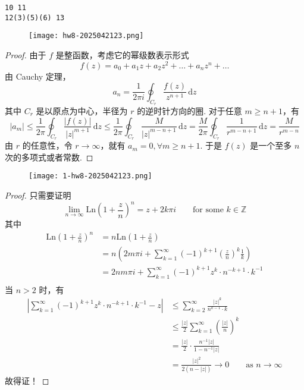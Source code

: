 \begin{lstlisting}
10 11 
12(3)(5)(6) 13
\end{lstlisting}
\begin{exercise}
\begin{figure}[H]
\centering
\texttt{[image: hw8-2025042123.png]}
\label{}
\end{figure}
\end{exercise}
\begin{proof}
由于 $f$ 是整函数，考虑它的幂级数表示形式
\[
f(z)=a_0+a_1z+a_2z^2+\dots+a_nz^{n}+\dots
\]
由 Cauchy 定理，
\[
a_n=\frac{1}{2\pi i}\oint_{C_{r}} \frac{f(z)}{z^{n+1}} \, \mathrm{d}z
\]
其中 $C_{r}$ 是以原点为中心，半径为 $r$ 的逆时针方向的圈. 对于任意 $m\geq n+1$，有
\[
\lvert a_m \rvert \leq \frac{1}{2\pi}\oint_{C_{r}} \frac{\lvert f(z) \rvert }{\lvert z \rvert ^{m+1}} \, \mathrm{d}z  \leq \frac{1}{2\pi}\oint_{C_{r}} \frac{M}{\lvert z \rvert ^{m-n+1}} \, \mathrm{d}z =\frac{M}{2\pi}\oint_{C_{r}} \frac{1}{r^{m-n+1}} \, \mathrm{d}z =\frac{M}{r^{m-n}}
\]
由 $r$ 的任意性，令 $r\to \infty$，就有 $a_m=0,\forall m\geq n+1$. 于是 $f(z)$ 是一个至多 $n$ 次的多项式或者常数.
\end{proof}

\begin{exercise}
\begin{figure}[H]
\centering
\texttt{[image: 1-hw8-2025042123.png]}
\label{}
\end{figure}
\end{exercise}
\begin{proof}
只需要证明
\[
\lim_{ n \to \infty } \mathrm{Ln}\left( 1+\frac{z}{n} \right)^{n}=z+2k\pi i \qquad \text{for some }k\in \mathbb{Z}
\]
其中
\[
\begin{aligned}
\mathrm{Ln}\left( 1+\frac{z}{n} \right)^{n} & =n\mathrm{Ln}\left( 1+\frac{z}{n} \right) \\
 & =n\left( 2m\pi i +\sum_{k=1}^{\infty} (-1)^{k+1}\left( \frac{z}{n} \right)^{k}\frac{1}{k} \right) \\
 & =2nm\pi i+\sum_{k=1}^{\infty} (-1)^{k+1}z^{k}\cdot n^{-k+1}\cdot k^{-1} \\
\end{aligned}
\]
当 $n>2$ 时，有
\[
\begin{aligned}
\left\lvert  \sum_{k=1}^{\infty} (-1)^{k+1}z^{k}\cdot n^{-k+1}\cdot k^{-1}-z  \right\rvert  & \leq \sum_{k=2}^\infty{}\frac{\lvert z \rvert ^{k}}{n^{k-1}\cdot k} \\
 &  \leq \frac{\lvert z \rvert }{2}\sum_{k=1}^{\infty} \left( \frac{\lvert z \rvert }{n} \right)^{k}  \\
 & =\frac{\lvert z \rvert }{2}\cdot\frac{n^{-1}\lvert z \rvert }{1-n^{-1}\lvert z \rvert } \\
 & =\frac{\lvert z \rvert ^2}{2(n-\lvert z \rvert )}\to0\qquad \text{as }n\to \infty
\end{aligned}
\]
故得证！
\end{proof}

